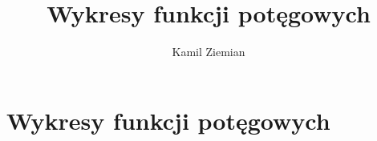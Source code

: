 \documentclass[a4paper,11pt]{article}
\title{Wykresy funkcji potęgowych}
\author{Kamil Ziemian}
\numberwithin{equation}{section}
\begin{document}





\maketitle




















\section{Wykresy funkcji potęgowych}

\label{sec:Funkcje-trygonometryczne}









\end{document}
